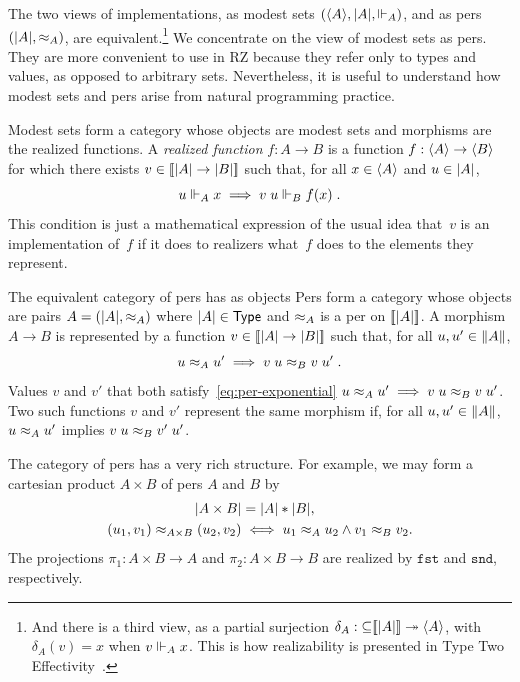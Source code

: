 The two views of implementations, as modest sets $(\langle A \rangle,
|A|, {\Vdash_A})$, and as pers $(|A|, {\approx_A})$, are
equivalent.\footnote{And there is a third view, as a partial surjection
  $\delta_A : {\subseteq}[\![|A|]\!] \twoheadrightarrow \langle A \rangle$, with
  $\delta_A(v) = x$ when $v \Vdash_A x$. This is how realizability is
  presented in Type Two Effectivity~\cite{Wei00}.} 
%
We concentrate on the view of modest sets as pers. They are more
convenient to use in RZ because they refer only to types and values,
as opposed to arbitrary sets.
%
Nevertheless, it is useful to understand
how modest sets and pers arise from natural programming practice.

\iflong
%
Modest sets form a category whose objects are modest sets and
morphisms are the realized functions. A \emph{realized function} $f :
A \to B$ is a function $f : \langle A \rangle \to \langle B \rangle$ for which there
exists $v \in [\![|A| \to |B|]\!]$ such that, for all
$x \in \langle A \rangle$ and $u \in |A|$,
%
\begin{equation}
  \label{eq:rz-function-space}
  u \Vdash_A x \implies v\;u \Vdash_B f(x) \;.
\end{equation}
%
This condition is just a mathematical expression of the usual idea
that~$v$ is an implementation of~$f$ if it does to realizers
what~$f$ does to the elements they represent.
\fi

\iflong
The equivalent category of pers has as objects
\else
Pers form a category whose objects are
\fi
%
pairs $A = (|A|, {\approx_A})$ where $|A| \in \mathsf{Type}$ and
$\approx_A$ is a per on $[\![|A|]\!]$. A morphism $A \to B$ is
represented by a function $v\in [\![|A| \to |B|]\!]$
such that, for all $u, u' \in \|A\|$,
%
\iflong
\begin{equation}
  \label{eq:per-exponential}
  u \approx_A u' \implies v\;u \approx_B v\;u' \;.
\end{equation}
%
Values $v$ and $v'$ that both satisfy~\eqref{eq:per-exponential}
\else %
$u \approx_A u' \implies v\;u \approx_B v\;u'$.  Two such functions $v$ and $v'$
\fi
represent the same morphism if, for all $u, u' \in \|A\|$,
$u \approx_A u'$ implies $v\;u \approx_B v'\;u'$.

\iflong
%
The category of pers has a very rich structure. For example, we may
form a cartesian product $A \times B$ of pers $A$ and $B$ by
%
\begin{align*}
  |A \times B| &= |A| * |B|,\\
  (u_1, v_1) \approx_{A \times B} (u_2, v_2) &\iff
  u_1 \approx_A u_2 \land v_1 \approx_B v_2.
\end{align*}
%
The projections $\pi_1 : A \times B \to A$ and $\pi_2 : A \times B \to
B$ are realized by $\mathtt{fst}$ and $\mathtt{snd}$, respectively.

